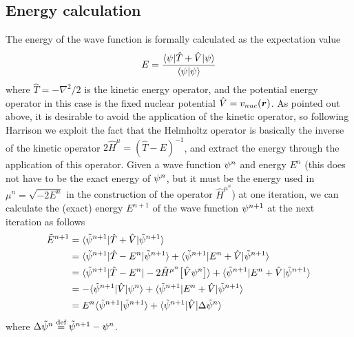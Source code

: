 \subsection{Energy calculation}
The energy of the wave function is formally calculated as the expectation value
\begin{equation}
    E = \frac{\langle\psi| \hat{T} + \hat{V} | \psi\rangle}
	{\langle\psi|\psi\rangle} 
\end{equation}
where $\hat{T}=-\nabla^2/2$ is the kinetic energy operator, and the potential energy operator 
in this case is the fixed nuclear potential $\hat{V} = v_{nuc}(\boldsymbol r)$. As pointed out above, 
it is desirable to avoid the application of the kinetic operator, so following Harrison 
\etal\cite{Harrison_basic:2004} we exploit the fact that the Helmholtz operator is basically the 
inverse of the kinetic operator $2\hat{H}^{\mu} = (\hat{T} - E)^{-1}$, and extract the energy 
through the application of this operator. Given a wave function $\psi^{n}$ and energy 
$E^{n}$ (this does not have to be the exact energy of $\psi^{n}$, but it must be the 
energy used in $\mu^n=\sqrt{-2E^n}$ in the construction of the operator $\hat{H}^{\mu^n}$) at 
one iteration, we can calculate the (exact) energy $E^{n+1}$ of the wave function 
$\psi^{n+1}$ at the next iteration as follows
\begin{align}
    \tilde{E}^{n+1}
    &=	\langle\tilde{\psi}^{n+1}| \hat{T}+\hat{V} | \tilde{\psi}^{n+1}\rangle\\
    &=	\langle\tilde{\psi}^{n+1}|  \hat{T} - E^n  | \tilde{\psi}^{n+1}\rangle
    +	\langle\tilde{\psi}^{n+1}|  E^n + \hat{V}  | \tilde{\psi}^{n+1}\rangle\\
    &=	\langle\tilde{\psi}^{n+1}|  \hat{T} - E^n  | 
	    -2\hat{H}^{\mu^n}\big[\hat{V}\psi^n\big]\rangle
    +	\langle\tilde{\psi}^{n+1}| E^n + \hat{V} |\tilde{\psi}^{n+1}\rangle\\
    &= -\langle\tilde{\psi}^{n+1}| \hat{V} |\psi^{n}\rangle
    +	\langle\tilde{\psi}^{n+1}| E^n + \hat{V} |\tilde{\psi}^{n+1}\rangle\\
    &= E^{n}\langle\tilde{\psi}^{n+1}|\tilde{\psi}^{n+1}\rangle + 
	\langle\tilde{\psi}^{n+1}| \hat{V} |\Delta\tilde{\psi}^{n}\rangle
\end{align}
where $\Delta \tilde{\psi}^{n} \stackrel{\text{def}}{\hbox{=}} \tilde{\psi}^{n+1} - \psi^{n}$.

